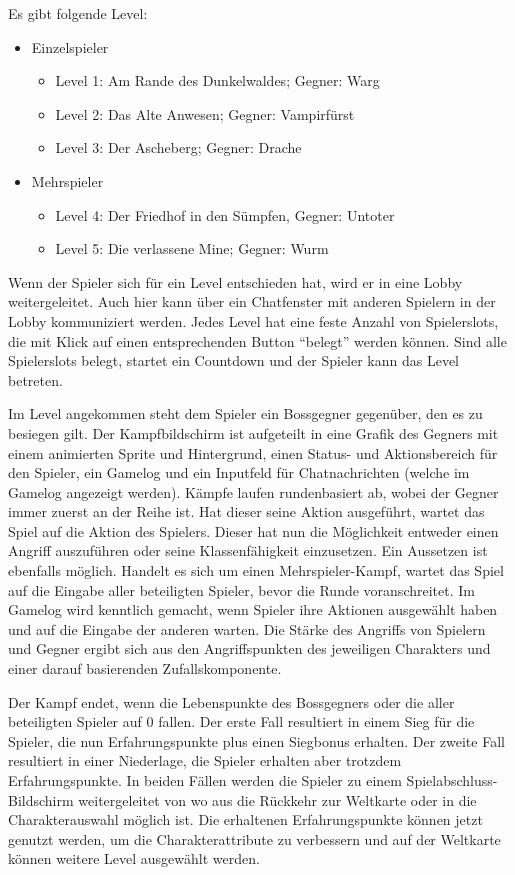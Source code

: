 Es gibt folgende Level:
\begin{itemize}
    \item Einzelspieler
    \begin{itemize}
        \item Level 1:  Am Rande des Dunkelwaldes; Gegner: Warg
        \item Level 2:  Das Alte Anwesen; Gegner: Vampirfürst
        \item Level 3:  Der Ascheberg; Gegner: Drache
    \end{itemize}
    \item Mehrspieler
    \begin{itemize}
        \item Level 4:  Der Friedhof in den Sümpfen, Gegner: Untoter
        \item Level 5:  Die verlassene Mine; Gegner: Wurm
    \end{itemize}
\end{itemize}

Wenn der Spieler sich für ein Level entschieden hat, wird er in eine Lobby weitergeleitet. Auch hier kann über ein Chatfenster mit anderen Spielern in der Lobby kommuniziert werden. Jedes Level hat eine feste Anzahl von Spielerslots, die mit Klick auf einen entsprechenden Button \enquote{belegt} werden können. Sind alle Spielerslots belegt, startet ein Countdown und der Spieler kann das Level betreten. 

Im Level angekommen steht dem Spieler ein Bossgegner gegenüber, den es zu besiegen gilt. Der Kampfbildschirm ist aufgeteilt in eine Grafik des Gegners mit einem animierten Sprite und Hintergrund, einen Status- und Aktionsbereich für den Spieler, ein Gamelog und ein Inputfeld für Chatnachrichten (welche im Gamelog angezeigt werden). Kämpfe laufen rundenbasiert ab, wobei der Gegner immer zuerst an der Reihe ist. Hat dieser seine Aktion ausgeführt, wartet das Spiel auf die Aktion des Spielers. Dieser hat nun die Möglichkeit entweder einen Angriff auszuführen oder seine Klassenfähigkeit einzusetzen. Ein Aussetzen ist ebenfalls möglich.
Handelt es sich um einen Mehrspieler-Kampf, wartet das Spiel auf die Eingabe aller beteiligten Spieler, bevor die Runde voranschreitet. Im Gamelog wird kenntlich gemacht, wenn Spieler ihre Aktionen ausgewählt haben und auf die Eingabe der anderen warten. 
Die Stärke des Angriffs von Spielern und Gegner ergibt sich aus den Angriffspunkten des jeweiligen Charakters und einer darauf basierenden Zufallskomponente.

Der Kampf endet, wenn die Lebenspunkte des Bossgegners oder die aller beteiligten Spieler auf 0 fallen. Der erste Fall resultiert in einem Sieg für die Spieler, die nun Erfahrungspunkte plus einen Siegbonus erhalten. Der zweite Fall resultiert in einer Niederlage, die Spieler erhalten aber trotzdem Erfahrungspunkte. In beiden Fällen werden die Spieler zu einem Spielabschluss-Bildschirm weitergeleitet von wo aus die Rückkehr zur Weltkarte oder in die Charakterauswahl möglich ist. Die erhaltenen Erfahrungspunkte können jetzt genutzt werden, um die Charakterattribute zu verbessern und auf der Weltkarte können weitere Level ausgewählt werden.

